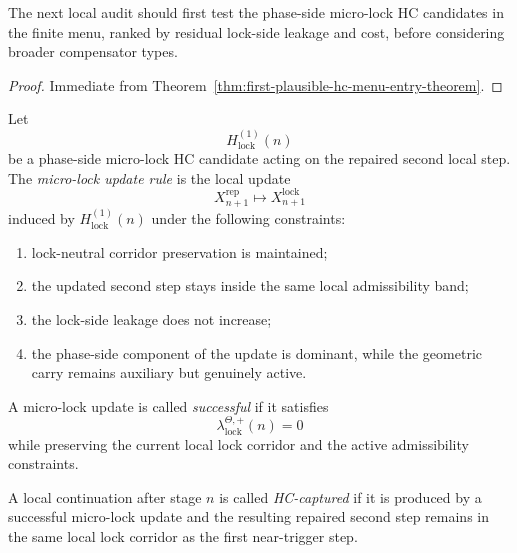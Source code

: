 \begin{corollary}
\label{cor:current-hc-entry-working-rule}
The next local audit should first test the phase-side micro-lock HC candidates in the finite menu, ranked by residual lock-side leakage and cost, before considering broader compensator types.
\end{corollary}

\begin{proof}
Immediate from Theorem~\ref{thm:first-plausible-hc-menu-entry-theorem}.
\end{proof}



\begin{definition}
\label{def:micro-lock-update-rule}
Let
\[
  H_{\mathrm{lock}}^{(1)}(n)
\]
be a phase-side micro-lock HC candidate acting on the repaired second local step. The \emph{micro-lock update rule} is the local update
\[
  X_{n+1}^{\mathrm{rep}}
  \longmapsto
  X_{n+1}^{\mathrm{lock}}
\]
induced by $H_{\mathrm{lock}}^{(1)}(n)$ under the following constraints:
\begin{enumerate}[leftmargin=2em,label=(\alph*)]
  \item lock-neutral corridor preservation is maintained;
  \item the updated second step stays inside the same local admissibility band;
  \item the lock-side leakage does not increase;
  \item the phase-side component of the update is dominant, while the geometric carry remains auxiliary but genuinely active.
\end{enumerate}
\end{definition}

\begin{definition}
\label{def:successful-micro-lock-update}
A micro-lock update is called \emph{successful} if it satisfies
\[
  \lambda_{\mathrm{lock}}^{\Theta,+}(n)=0
\]
while preserving the current local lock corridor and the active admissibility constraints.
\end{definition}

\begin{definition}
\label{def:hc-captured-local-continuation}
A local continuation after stage $n$ is called \emph{HC-captured} if it is produced by a successful micro-lock update and the resulting repaired second step remains in the same local lock corridor as the first near-trigger step.
\end{definition}

